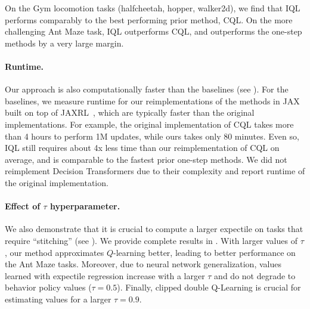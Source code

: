 \documentclass{article} %
\def\ourname{IQL\xspace}
\begin{document}
%
On the Gym locomotion tasks (halfcheetah, hopper, walker2d), we find that \ourname performs comparably to the best performing prior method, CQL. On the more challenging Ant Maze task, \ourname outperforms CQL, and outperforms the one-step methods by a very large margin.


\vspace{-0.15in}
\paragraph{Runtime.} Our approach is also computationally faster than the baselines (see ). For the baselines, we measure runtime for our reimplementations of the methods in JAX~\citep{jax2018github} built on top of JAXRL~\citep{jaxrl}, which are typically faster than the original implementations. For example, the original implementation of CQL takes more than 4 hours to perform 1M updates, while ours takes only 80 minutes. Even so, \ourname still requires about 4x less time than our reimplementation of CQL on average, and is comparable to the fastest prior one-step methods. We did not reimplement Decision Transformers due to their complexity and report runtime of the original implementation.


\vspace{-0.1in}
\paragraph{Effect of $\tau$ hyperparameter.} We also demonstrate that it is crucial to compute a larger expectile on tasks that require ``stitching'' (see ). We provide complete results in .
With larger values of $\tau$, our method approximates $Q$-learning better, leading to better performance on the Ant Maze tasks. Moreover, due to neural network generalization, values learned with expectile regression increase with a larger $\tau$ and do not degrade to behavior policy values ($\tau=0.5$). Finally, clipped double Q-Learning is crucial for estimating values for a larger $\tau=0.9$.
\end{document}

